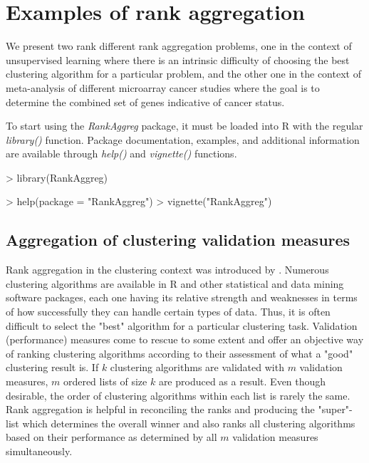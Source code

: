 \documentclass[11pt]{article}
\begin{document}
\section{Examples of rank aggregation}
    We present two rank different rank aggregation problems, one in the context of unsupervised learning where there
    is an intrinsic difficulty of choosing the best clustering algorithm for a particular problem, and the other one
    in the context of meta-analysis of different microarray cancer studies where the goal is to determine the combined
    set of genes indicative of cancer status. 
    
    To start using the \emph{RankAggreg} package, it must be loaded into R with the regular \emph{library()} function.
    Package documentation, examples, and additional information are available through \emph{help()} and \emph{vignette()} functions.
    
\begin{Schunk}
\begin{Sinput}
> library(RankAggreg)
\end{Sinput}
\end{Schunk}
\begin{Schunk}
\begin{Sinput}
> help(package = "RankAggreg")
> vignette("RankAggreg")
\end{Sinput}
\end{Schunk}

\subsection{Aggregation of clustering validation measures}
    Rank aggregation in the clustering context was introduced by \cite{Pih07}. Numerous clustering algorithms are available in R and other
    statistical and data mining software packages, each
    one having its relative strength and weaknesses in terms of how successfully they can handle certain types of data. Thus, it is often difficult to
    select the "best" algorithm for a particular clustering task. Validation (performance) measures come to rescue to some extent and offer an 
    objective way of ranking clustering algorithms according to their assessment of what a "good" clustering result is. 
    If $k$ clustering algorithms are validated with $m$ validation measures, $m$ ordered lists of size $k$ are produced as a result. Even though desirable,
    the order of clustering algorithms within each list is rarely the same.
    Rank aggregation is helpful in reconciling the ranks and producing the "super"-list which determines the overall winner and also ranks all
    clustering algorithms based on their performance as determined by all $m$ validation measures simultaneously.
    
\end{document}
